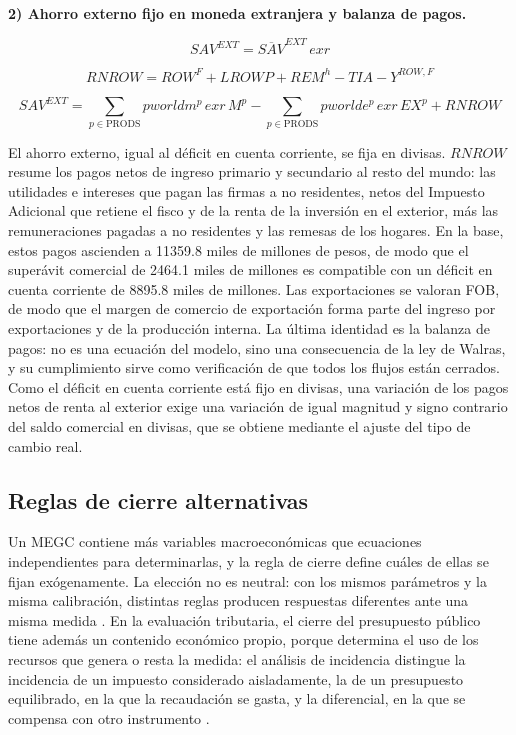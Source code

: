 \documentclass[11pt]{article}
\begin{document}
\textbf{2) Ahorro externo fijo en moneda extranjera y balanza de pagos.}

\[
SAV^{EXT}=\overline{SAV}^{EXT}\,exr
\]

\[
RNROW=ROW^{F}+LROWP+REM^{h}-TIA-Y^{ROW,F}
\]

\[
SAV^{EXT}=\sum_{p\in\mathrm{PRODS}}pworldm^{p}\,exr\,M^{p}-\sum_{p\in\mathrm{PRODS}}pworlde^{p}\,exr\,EX^{p}+RNROW
\]

El ahorro externo, igual al déficit en cuenta corriente, se fija en divisas. $RNROW$ resume los pagos netos de ingreso primario y secundario al resto del mundo: las utilidades e intereses que pagan las firmas a no residentes, netos del Impuesto Adicional que retiene el fisco y de la renta de la inversión en el exterior, más las remuneraciones pagadas a no residentes y las remesas de los hogares. En la base, estos pagos ascienden a 11359.8 miles de millones de pesos, de modo que el superávit comercial de 2464.1 miles de millones es compatible con un déficit en cuenta corriente de 8895.8 miles de millones. Las exportaciones se valoran FOB, de modo que el margen de comercio de exportación forma parte del ingreso por exportaciones y de la producción interna. La última identidad es la balanza de pagos: no es una ecuación del modelo, sino una consecuencia de la ley de Walras, y su cumplimiento sirve como verificación de que todos los flujos están cerrados. Como el déficit en cuenta corriente está fijo en divisas, una variación de los pagos netos de renta al exterior exige una variación de igual magnitud y signo contrario del saldo comercial en divisas, que se obtiene mediante el ajuste del tipo de cambio real.

\subsection{Reglas de cierre alternativas}
\label{sec:cierres-alt}

Un MEGC contiene más variables macroeconómicas que ecuaciones independientes para determinarlas, y la regla de cierre define cuáles de ellas se fijan exógenamente. La elección no es neutral: con los mismos parámetros y la misma calibración, distintas reglas producen respuestas diferentes ante una misma medida \cite{sen_1963,taylor_lysy_1979,rattso_1982,dewatripont_michel_1987}. En la evaluación tributaria, el cierre del presupuesto público tiene además un contenido económico propio, porque determina el uso de los recursos que genera o resta la medida: el análisis de incidencia distingue la incidencia de un impuesto considerado aisladamente, la de un presupuesto equilibrado, en la que la recaudación se gasta, y la diferencial, en la que se compensa con otro instrumento \cite{musgrave_1959,shoven_whalley_1977}.
\end{document}
